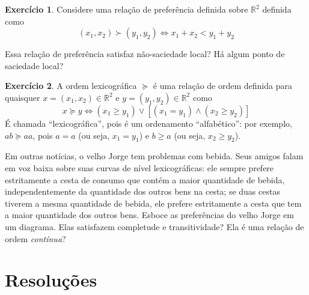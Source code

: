 \documentclass[12pt]{article}
\numberwithin{equation}{section}
\theoremstyle{plain}
\theoremstyle{definition}
\newtheorem{exercise}{Exercício}
\theoremstyle{remark}
\begin{document}
\begin{exercise}
  Considere uma relação de preferência definida
  sobre \(\mathbb{R}^2\) definida como \[
  (x_{1},x_{2}) \succ (y_{1}, y_{2}) \iff x_{1}+x_{2} < y_{1}+y_{2}
  \]
  
  Essa relação de preferência satisfaz não-saciedade local? Há algum ponto de saciedade local? 
\end{exercise}


\begin{exercise}
  \label{velhojorge}
  A ordem lexicográfica \(\succeq\) é uma relação
  de ordem definida para quaisquer \(x=(x_{1},x_{2}) \in \mathbb{R}^{2}\)
  e \(y =(y_{1},y_{2})\in \mathbb{R}^{2}\) como \[
  x \succeq y \iff (x_{1} \geq y_{1}) \lor [(x_{1} = y_{1}) \land (x_{2} \geq y_{2})]
  \] É chamada ``lexicográfica'', pois é um ordenamento ``alfabético'': por
  exemplo, \(ab \succeq aa\), pois \(a=a\) (ou seja, \(x_{1}=y_{1}\)) e
  \(b\geq a\) (ou seja, \(x_{2}\geq y_{2}\)).
  
  Em outras notícias, o velho Jorge tem problemas com bebida. Seus amigos falam em voz baixa sobre suas curvas de nível lexicográficas: ele sempre prefere estritamente a cesta de consumo que contém a maior quantidade de bebida, independentemente da quantidade dos outros bens na cesta; se duas cestas tiverem a mesma quantidade de bebida, ele prefere estritamente a cesta que tem a maior quantidade dos outros bens. Esboce as preferências do
  velho Jorge em um diagrama. Elas satisfazem completude e transitividade? Ela é uma relação de ordem \emph{contínua}? 

\end{exercise}  

\section{Resoluções}
\setcounter{exercise}{0}
\end{document}
